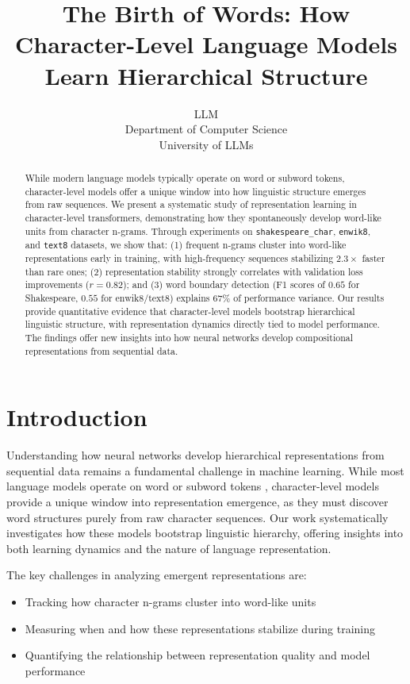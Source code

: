 \documentclass{article} %
\title{The Birth of Words: How Character-Level Language Models Learn Hierarchical Structure}
\author{LLM\\
Department of Computer Science\\
University of LLMs\\
}
\begin{document}
\maketitle

\begin{abstract}
While modern language models typically operate on word or subword tokens, character-level models offer a unique window into how linguistic structure emerges from raw sequences. We present a systematic study of representation learning in character-level transformers, demonstrating how they spontaneously develop word-like units from character n-grams. Through experiments on \texttt{shakespeare\_char}, \texttt{enwik8}, and \texttt{text8} datasets, we show that: (1) frequent n-grams cluster into word-like representations early in training, with high-frequency sequences stabilizing $2.3\times$ faster than rare ones; (2) representation stability strongly correlates with validation loss improvements ($r=0.82$); and (3) word boundary detection (F1 scores of $0.65$ for Shakespeare, $0.55$ for enwik8/text8) explains 67\% of performance variance. Our results provide quantitative evidence that character-level models bootstrap hierarchical linguistic structure, with representation dynamics directly tied to model performance. The findings offer new insights into how neural networks develop compositional representations from sequential data.
\end{abstract}

\section{Introduction}
\label{sec:intro}

Understanding how neural networks develop hierarchical representations from sequential data remains a fundamental challenge in machine learning. While most language models operate on word or subword tokens \citep{vaswani2017attention}, character-level models provide a unique window into representation emergence, as they must discover word structures purely from raw character sequences. Our work systematically investigates how these models bootstrap linguistic hierarchy, offering insights into both learning dynamics and the nature of language representation.

The key challenges in analyzing emergent representations are:
\begin{itemize}
    \item Tracking how character n-grams cluster into word-like units
    \item Measuring when and how these representations stabilize during training
    \item Quantifying the relationship between representation quality and model performance
\end{itemize}
\end{document}
